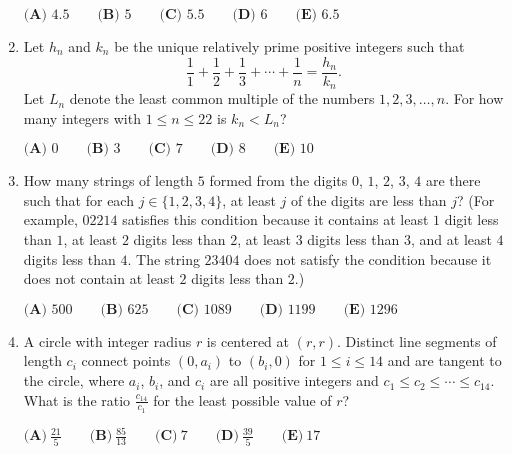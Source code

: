 \documentclass{article}
\begin{document}
\begin{enumerate}[label=\arabic*., itemsep=0.5em]
$\textbf{(A) }4.5 \qquad\textbf{(B) }5 \qquad\textbf{(C) }5.5 \qquad\textbf{(D) }6\qquad\textbf{(E) }6.5$\par \vspace{0.5em}\item Let $h_n$ and $k_n$ be the unique relatively prime positive integers such that 
\begin{equation*}
\frac{1}{1}+\frac{1}{2}+\frac{1}{3}+\cdots+\frac{1}{n}=\frac{h_n}{k_n}.
\end{equation*}
 Let $L_n$ denote the least common multiple of the numbers $1, 2, 3, \ldots, n$. For how many integers with $1\le{n}\le{22}$ is $k_n<L_n$?

$\textbf{(A) }0 \qquad\textbf{(B) }3 \qquad\textbf{(C) }7 \qquad\textbf{(D) }8\qquad\textbf{(E) }10$\par \vspace{0.5em}\item How many strings of length $5$ formed from the digits $0$, $1$, $2$, $3$, $4$ are there such that for each $j \in \{1,2,3,4\}$, at least $j$ of the digits are less than $j$? (For example, $02214$ satisfies this condition
because it contains at least $1$ digit less than $1$, at least $2$ digits less than $2$, at least $3$ digits less
than $3$, and at least $4$ digits less than $4$. The string $23404$ does not satisfy the condition because it
does not contain at least $2$ digits less than $2$.)

$\textbf{(A) }500\qquad\textbf{(B) }625\qquad\textbf{(C) }1089\qquad\textbf{(D) }1199\qquad\textbf{(E) }1296$\par \vspace{0.5em}\item A circle with integer radius $r$ is centered at $(r, r)$. Distinct line segments of length $c_i$ connect points $(0, a_i)$ to $(b_i, 0)$ for $1 \le i \le 14$ and are tangent to the circle, where $a_i$, $b_i$, and $c_i$ are all positive integers and $c_1 \le c_2 \le \cdots \le c_{14}$. What is the ratio $\frac{c_{14}}{c_1}$ for the least possible value of $r$?

$\textbf{(A)} ~\frac{21}{5} \qquad\textbf{(B)} ~\frac{85}{13} \qquad\textbf{(C)} ~7 \qquad\textbf{(D)} ~\frac{39}{5} \qquad\textbf{(E)} ~17 $\par \vspace{0.5em}\end{enumerate}
\end{document}
